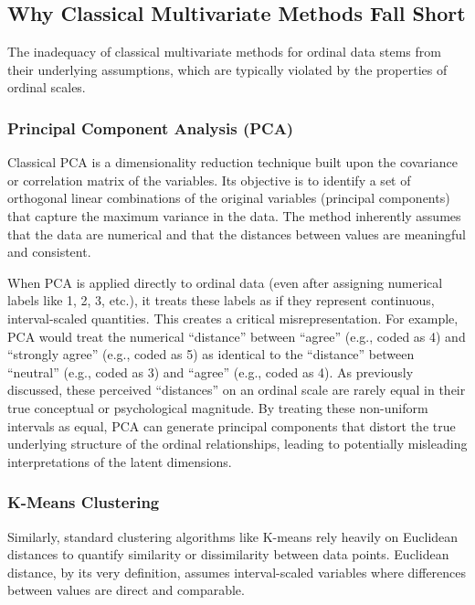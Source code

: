\documentclass[
  letterpaper,
  DIV=11,
  numbers=noendperiod]{scrartcl}
\begin{document}
\hypertarget{why-classical-multivariate-methods-fall-short}{%
\subsection{Why Classical Multivariate Methods Fall
Short}\label{why-classical-multivariate-methods-fall-short}}

The inadequacy of classical multivariate methods for ordinal data stems
from their underlying assumptions, which are typically violated by the
properties of ordinal scales.

\hypertarget{principal-component-analysis-pca}{%
\subsubsection{Principal Component Analysis
(PCA)}\label{principal-component-analysis-pca}}

Classical PCA is a dimensionality reduction technique built upon the
covariance or correlation matrix of the variables. Its objective is to
identify a set of orthogonal linear combinations of the original
variables (principal components) that capture the maximum variance in
the data. The method inherently assumes that the data are numerical and
that the distances between values are meaningful and consistent.

When PCA is applied directly to ordinal data (even after assigning
numerical labels like 1, 2, 3, etc.), it treats these labels as if they
represent continuous, interval-scaled quantities. This creates a
critical misrepresentation. For example, PCA would treat the numerical
``distance'' between ``agree'' (e.g., coded as 4) and ``strongly agree''
(e.g., coded as 5) as identical to the ``distance'' between ``neutral''
(e.g., coded as 3) and ``agree'' (e.g., coded as 4). As previously
discussed, these perceived ``distances'' on an ordinal scale are rarely
equal in their true conceptual or psychological magnitude. By treating
these non-uniform intervals as equal, PCA can generate principal
components that distort the true underlying structure of the ordinal
relationships, leading to potentially misleading interpretations of the
latent dimensions.

\hypertarget{k-means-clustering}{%
\subsubsection{K-Means Clustering}\label{k-means-clustering}}

Similarly, standard clustering algorithms like K-means rely heavily on
Euclidean distances to quantify similarity or dissimilarity between data
points. Euclidean distance, by its very definition, assumes
interval-scaled variables where differences between values are direct
and comparable.
\end{document}
